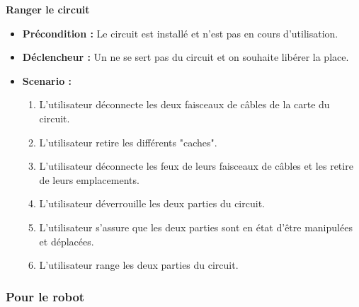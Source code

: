 		\textbf{Ranger le circuit}
		\begin{itemize}
			\item \textbf{Précondition :} Le circuit est installé et n'est pas en cours d'utilisation.
			\item \textbf{Déclencheur :} Un ne se sert pas du circuit et on souhaite libérer la place.
			\item \textbf{Scenario :}
			\begin{enumerate}
				\item L'utilisateur déconnecte les deux faisceaux de câbles de la carte du circuit.
				\item L'utilisateur retire les différents "caches".
				\item L'utilisateur déconnecte les feux de leurs faisceaux de câbles et les retire de leurs emplacements.
				\item L'utilisateur déverrouille les deux parties du circuit.
				\item L'utilisateur s'assure que les deux parties sont en état d'être manipulées et déplacées.
				\item L'utilisateur range les deux parties du circuit.
			\end{enumerate}
		\end{itemize}

	\subsubsection{Pour le robot}


